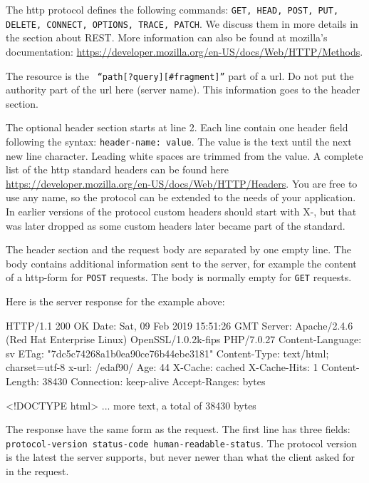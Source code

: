The http protocol defines the following commands: \texttt{GET, HEAD, POST, PUT, DELETE, CONNECT, OPTIONS, TRACE, PATCH}. We discuss them in more details in the section about REST. More information can also be found at mozilla's documentation: \url{https://developer.mozilla.org/en-US/docs/Web/HTTP/Methods}.

The resource is the \texttt{ ``path[?query][\#fragment]''} part of a url. Do not put the authority part of the url here (server name). This information goes to the header section.
 
The optional header section starts at line 2. Each line contain one header field following the syntax: \texttt{header-name: value}. The value is the text until the next new line character. Leading white spaces are trimmed from the value.
A complete list of the http standard headers can be found here \url{https://developer.mozilla.org/en-US/docs/Web/HTTP/Headers}. You are free to use any name, so the protocol can be extended to the needs of your application. In earlier versions of the protocol custom headers should start with X-, but that was later dropped as some custom headers later became part of the standard. 

The header section and the request body are separated by one empty line. The body contains additional information sent to the server, for example the content of a http-form for \texttt{POST} requests. The body is normally empty for \texttt{GET} requests.

Here is the server response for the example above:
\begin{Code}
HTTP/1.1 200 OK
Date: Sat, 09 Feb 2019 15:51:26 GMT
Server: Apache/2.4.6 (Red Hat Enterprise Linux) OpenSSL/1.0.2k-fips PHP/7.0.27
Content-Language: sv
ETag: "7dc5c74268a1b0ea90ce76b44ebe3181"
Content-Type: text/html; charset=utf-8
x-url: /edaf90/
Age: 44
X-Cache: cached
X-Cache-Hits: 1
Content-Length: 38430
Connection: keep-alive
Accept-Ranges: bytes

<!DOCTYPE html>
... more text, a total of 38430 bytes
\end{Code}
The response have the same form as the request. The first line has three fields:\\ \texttt{protocol-version status-code human-readable-status}.
The protocol version is the latest the server supports, but never newer than what the client asked for in the request.

